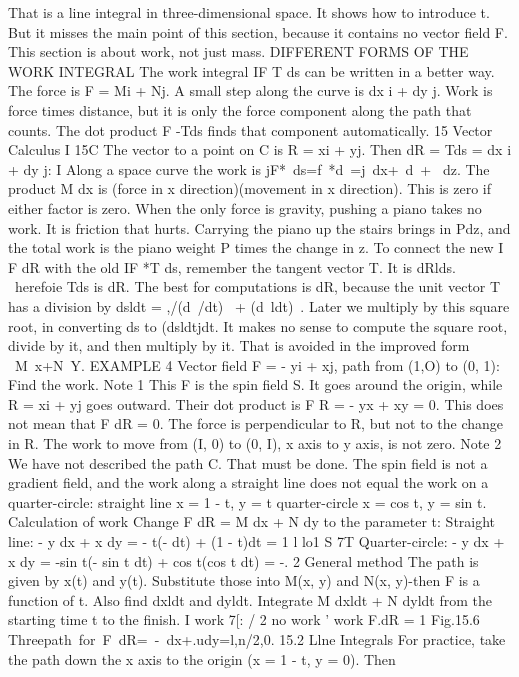 That is a line integral in three-dimensional space. It shows how to introduce t. But
it misses the main point of this section, because it contains no vector field F. This
section is about work, not just mass.
DIFFERENT FORMS OF THE WORK INTEGRAL
The work integral IF T ds can be written in a better way. The force is F = Mi + Nj.
A small step along the curve is dx i + dy j. Work is force times distance, but it is only
the force component along the path that counts. The dot product F -Tds finds that
component automatically. 
15 Vector Calculus
I 15C The vector to a point on C is R = xi + yj. Then dR = Tds = dx i + dy j:
I Along a space curve the work is jF*~ds=f~*d~=j~dx+~d~+ ~dz.
The product M dx is (force in x direction)(movement in x direction). This is zero if
either factor is zero. When the only force is gravity, pushing a piano takes no work.
It is friction that hurts. Carrying the piano up the stairs brings in Pdz, and the total
work is the piano weight P times the change in z.
To connect the new I F dR with the old IF *T ds, remember the tangent vector
T. It is dRlds. ~herefoie Tds is dR. The best for computations is dR, because the
unit vector T has a division by dsldt = ,/(d~/dt)~ + (d~ldt)~. Later we multiply by this
square root, in converting ds to (dsldtjdt. It makes no sense to compute the square
root, divide by it, and then multiply by it. That is avoided in the improved form
~M~x+N~Y.
EXAMPLE 4 Vector field F = - yi + xj, path from (1,O) to (0, 1): Find the work.
Note 1 This F is the spin field S. It goes around the origin, while R = xi + yj goes
outward. Their dot product is F R = - yx + xy = 0. This does not mean that
F dR = 0. The force is perpendicular to R, but not to the change in R. The work to
move from (I, 0) to (0, I), x axis to y axis, is not zero.
Note 2 We have not described the path C. That must be done. The spin field is not
a gradient field, and the work along a straight line does not equal the work on a
quarter-circle:
straight line x = 1 - t, y = t quarter-circle x = cos t, y = sin t.
Calculation of work Change F dR = M dx + N dy to the parameter t:
Straight line: - y dx + x dy = - t(- dt) + (1 - t)dt = 1 l lo1
S 7T
Quarter-circle: - y dx + x dy = -sin t(- sin t dt) + cos t(cos t dt) = -. 2
General method The path is given by x(t) and y(t). Substitute those into M(x, y)
and N(x, y)-then F is a function of t. Also find dxldt and dyldt. Integrate
M dxldt + N dyldt from the starting time t to the finish.
I work 7[: / 2 no work ' work F.dR = 1
Fig.15.6 Threepath~for~F~dR=~-~dx+.udy=l,n/2,0. 
15.2 Llne Integrals
For practice, take the path down the x axis to the origin (x = 1 - t, y = 0). Then
